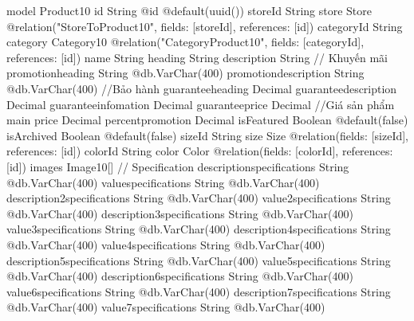 model Product10 {
  id                           String                         @id @default(uuid())
  storeId                      String
  store                        Store                          @relation("StoreToProduct10", fields: [storeId], references: [id])
  categoryId                   String
  category                     Category10                      @relation("CategoryProduct10", fields: [categoryId], references: [id])
  name                         String
  heading                      String
  description                  String
  // Khuyến mãi
  promotionheading             String                         @db.VarChar(400)
  promotiondescription         String                         @db.VarChar(400)
  //Bảo hành
  guaranteeheading             Decimal
  guaranteedescription         Decimal
  guaranteeinfomation          Decimal
  guaranteeprice               Decimal
  //Giá sản phẩm main
  price                        Decimal
  percentpromotion             Decimal
  isFeatured                   Boolean                        @default(false)
  isArchived                   Boolean                        @default(false)
  sizeId                       String
  size                         Size                           @relation(fields: [sizeId], references: [id])
  colorId                      String
  color                        Color                          @relation(fields: [colorId], references: [id])
  images                       Image10[]
  // Specification
  descriptionspecifications    String                         @db.VarChar(400)
  valuespecifications          String                         @db.VarChar(400)
  description2specifications   String                         @db.VarChar(400)
  value2specifications         String                         @db.VarChar(400)
  description3specifications   String                         @db.VarChar(400)
  value3specifications         String                         @db.VarChar(400)
  description4specifications   String                         @db.VarChar(400)
  value4specifications         String                         @db.VarChar(400)
  description5specifications   String                         @db.VarChar(400)
  value5specifications         String                         @db.VarChar(400)
  description6specifications   String                         @db.VarChar(400)
  value6specifications         String                         @db.VarChar(400)
  description7specifications   String                         @db.VarChar(400)
  value7specifications         String                         @db.VarChar(400)
}
